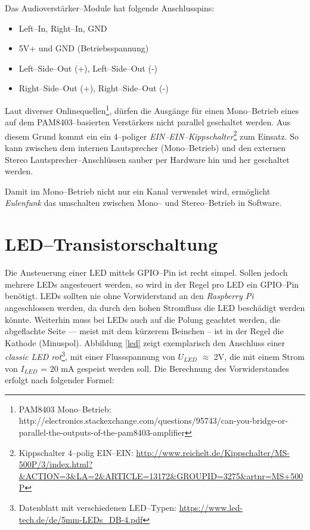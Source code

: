 \documentclass[11pt,ngerman,toc=listof,index=totoc]{scrreprt}
\providecommand{\tightlist}{%
  \setlength{\itemsep}{0pt}\setlength{\parskip}{0pt}}
\begin{document}
Das Audioverstärker--Module hat folgende Anschlusspins:

\begin{itemize}
\tightlist
\item
  Left--In, Right--In, GND
\item
  5V+ und GND (Betriebsspannung)
\item
  Left--Side--Out (+), Left--Side--Out (-)
\item
  Right--Side--Out (+), Right--Side--Out (-)
\end{itemize}

Laut diverser Onlinequellen\footnote{PAM8403 Mono--Betrieb:
  http://electronics.stackexchange.com/questions/95743/can-you-bridge-or-parallel-the-outputs-of-the-pam8403-amplifier},
dürfen die Ausgänge für einen Mono--Betrieb eines auf dem
PAM8403--basierten Verstärkers nicht parallel geschaltet werden. Aus
diesem Grund kommt ein ein 4--poliger
\emph{EIN--EIN--Kippschalter}\footnote{Kippschalter 4--polig EIN--EIN:
  \url{http://www.reichelt.de/Kippschalter/MS-500P/3/index.html?&ACTION=3&LA=2&ARTICLE=13172&GROUPID=3275&artnr=MS+500P}}
zum Einsatz. So kann zwischen dem internen Lautsprecher (Mono--Betrieb)
und den externen Stereo Lautsprecher--Anschlüssen sauber per Hardware
hin und her geschaltet werden.

Damit im Mono--Betrieb nicht nur ein Kanal verwendet wird, ermöglicht
\emph{Eulenfunk} das umschalten zwischen Mono-- und Stereo--Betrieb in
Software.

\section{LED--Transistorschaltung}\label{ledtransistorschaltung}

Die Ansteuerung einer LED mittels GPIO--Pin ist recht simpel. Sollen
jedoch mehrere LEDs angesteuert werden, so wird in der Regel pro LED ein
GPIO--Pin benötigt. LEDs sollten nie ohne Vorwiderstand an den
\emph{Raspberry Pi} angeschlossen werden, da durch den hohen Stromfluss
die LED beschädigt werden könnte. Weiterhin muss bei LEDs auch auf die
Polung geachtet werden, die abgeflachte Seite --- meist mit dem kürzerem
Beinchen -- ist in der Regel die Kathode (Minuspol). Abbildung \ref{led}
zeigt exemplarisch den Anschluss einer \emph{classic LED rot}\footnote{Datenblatt
  mit verschiedenen LED--Typen:
  \url{https://www.led-tech.de/de/5mm-LEDs_DB-4.pdf}}, mit einer
Flussspannung von \(U_{LED}\) \(\approx\) 2V, die mit einem Strom von
\(I_{LED}\) = 20 mA gespeist werden soll. Die Berechnung des
Vorwiderstandes erfolgt nach folgender Formel:
\end{document}
